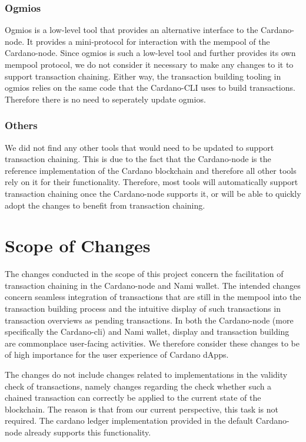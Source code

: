 \documentclass[11pt]{article}
\begin{document}
\subsubsection{Ogmios}

Ogmios is a low-level tool that provides an alternative interface to the Cardano-node.
It provides a mini-protocol for interaction with the mempool of the Cardano-node.
Since ogmios is such a low-level tool and further provides its own mempool protocol, we do not consider it necessary to make any changes to it to support transaction chaining.
Either way, the transaction building tooling in ogmios relies on the same code
that the Cardano-CLI uses to build transactions.
Therefore there is no need to seperately update ogmios.

\subsubsection{Others}

We did not find any other tools that would need to be updated to support transaction chaining.
This is due to the fact that the Cardano-node is the reference implementation of the Cardano blockchain and
therefore all other tools rely on it for their functionality.
Therefore, most tools will automatically support transaction chaining once the Cardano-node supports it, or will be able to quickly adopt the changes to benefit from transaction chaining.

\section{Scope of Changes}

The changes conducted in the scope of this project concern the facilitation of transaction chaining in
the Cardano-node and Nami wallet.
The intended changes concern seamless integration of transactions that are still in the mempool into the transaction building process
and the intuitive display of such transactions in transaction overviews as pending transactions.
In both the Cardano-node (more specifically the Cardano-cli) and Nami wallet,
display and transaction building are commonplace user-facing activities.
We therefore consider these changes to be of high importance for the user experience of Cardano dApps.

The changes do not include changes related to implementations in the validity check of transactions,
namely changes regarding the check whether such a chained transaction can correctly be applied to the current state of the blockchain.
The reason is that from our current perspective, this task is not required.
The cardano ledger implementation provided in the default Cardano-node already supports this functionality.
\end{document}
